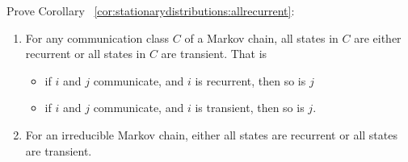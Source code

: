 \documentclass[12pt]{article}
\begin{document}
\begin{exercise}
    Prove Corollary~%
    \ref{cor:stationarydistributions:allrecurrent}:
    \begin{enumerate}
        \item
            For any communication class \( C \) of a Markov chain, all
            states in \( C \) are either recurrent or all states in \( C
            \) are transient.  That is
            \begin{itemize}
                \item
                    if \( i \) and \( j \) communicate, and \( i \) is
                    recurrent, then so is \( j \)
                \item
                    if \( i \) and \( j \) communicate, and \( i \) is
                    transient, then so is \( j \).
            \end{itemize}
        \item
            For an irreducible Markov chain, either all states are
            recurrent or all states are transient.
    \end{enumerate}
\end{exercise}
\end{document}
